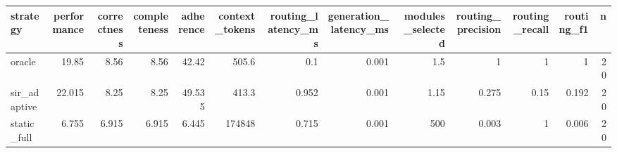 \begin{tabular}{lrrrrrrrrrrrr}
\toprule
 strategy     &   performance &   correctness &   completeness &   adherence &   context\_tokens &   routing\_latency\_ms &   generation\_latency\_ms &   modules\_selected &   routing\_precision &   routing\_recall &   routing\_f1 &   n \\
\midrule
 oracle       &        19.85  &         8.56  &          8.56  &      42.42  &            505.6 &                0.1   &                   0.001 &               1.5  &               1     &             1    &        1     &  20 \\
 sir\_adaptive &        22.015 &         8.25  &          8.25  &      49.535 &            413.3 &                0.952 &                   0.001 &               1.15 &               0.275 &             0.15 &        0.192 &  20 \\
 static\_full  &         6.755 &         6.915 &          6.915 &       6.445 &         174848   &                0.715 &                   0.001 &             500    &               0.003 &             1    &        0.006 &  20 \\
\bottomrule
\end{tabular}